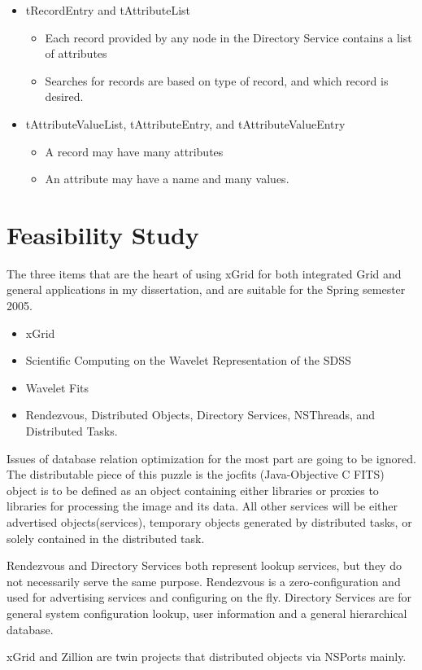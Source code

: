 \documentclass[11pt]{article}
\begin{document}
\begin{itemize}
\begin{itemize}
\end{itemize}
\item tRecordEntry and tAttributeList
\begin{itemize}
\item Each record provided by any node in the Directory Service contains a list of attributes
\item Searches for records are based on type of record, and which record is desired.  
\end{itemize}
\item tAttributeValueList, tAttributeEntry, and tAttributeValueEntry
\begin{itemize}
\item A record may have many attributes
\item An attribute may have a name and many values.
\end{itemize}


\end{itemize}


\section {Feasibility Study}
The three items that are the heart of using xGrid for both integrated Grid and general applications in my dissertation, and are suitable for the Spring semester 2005.    
\begin{itemize}
\item xGrid
\item Scientific Computing on the Wavelet Representation of the SDSS
\item Wavelet Fits
\item Rendezvous, Distributed Objects, Directory Services, NSThreads, and Distributed Tasks.
\end{itemize}
Issues of database relation optimization for the most part are going to be ignored.  The distributable piece of this puzzle is the jocfits (Java-Objective C FITS) object is to be defined as an object containing either libraries or proxies to libraries for processing the image and its data.   All other services will be either advertised objects(services), temporary objects generated by distributed tasks, or solely contained in the distributed task.  

Rendezvous and Directory Services both represent lookup services, but they do not necessarily serve the same purpose.   Rendezvous is a zero-configuration and used for advertising services and configuring on the fly.  Directory Services are for general system configuration lookup, user information and a general hierarchical database.

xGrid and Zillion are twin projects that distributed objects via NSPorts mainly.  







 
\end{document}
